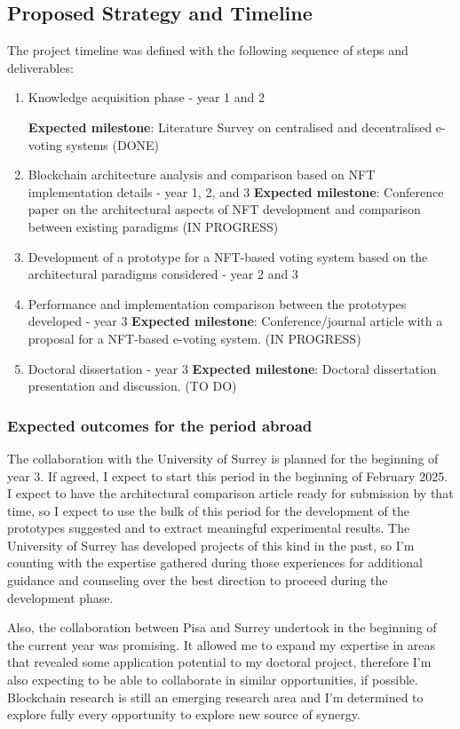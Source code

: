 \documentclass[../main.tex]{subfiles}
\begin{document}
\subsection{Proposed Strategy and Timeline}
The project timeline was defined with the following sequence of steps and deliverables:
\begin{enumerate}
    \item {Knowledge acquisition phase - year 1 and 2}
          \par
          \textbf{Expected milestone}: Literature Survey on centralised and decentralised e-voting systems (DONE)
    \item {Blockchain architecture analysis and comparison based on NFT implementation details - year 1, 2, and 3}
          \textbf{Expected milestone}: Conference paper on the architectural aspects of NFT development and comparison between existing paradigms (IN PROGRESS)
    \item {Development of a prototype for a NFT-based voting system based on the architectural paradigms considered - year 2 and 3}
    \item {Performance and implementation comparison between the prototypes developed - year 3}
          \textbf{Expected milestone}: Conference/journal article with a proposal for a NFT-based e-voting system. (IN PROGRESS)
    \item {Doctoral dissertation - year 3}
          \textbf{Expected milestone}: Doctoral dissertation presentation and discussion. (TO DO)
\end{enumerate}

\subsubsection{Expected outcomes for the period abroad}
The collaboration with the University of Surrey is planned for the beginning of year 3. If agreed, I expect to start this period in the beginning of February 2025. I expect to have the architectural comparison article ready for submission by that time, so I expect to use the bulk of this period for the development of the prototypes suggested and to extract meaningful experimental results. The University of Surrey has developed projects of this kind in the past, so I'm counting with the expertise gathered during those experiences for additional guidance and counseling over the best direction to proceed during the development phase.
\par
Also, the collaboration between Pisa and Surrey undertook in the beginning of the current year was promising. It allowed me to expand my expertise in areas that revealed some application potential to my doctoral project, therefore I'm also expecting to be able to collaborate in similar opportunities, if possible. Blockchain research is still an emerging research area and I'm determined to explore fully every opportunity to explore new source of synergy.
\end{document}
